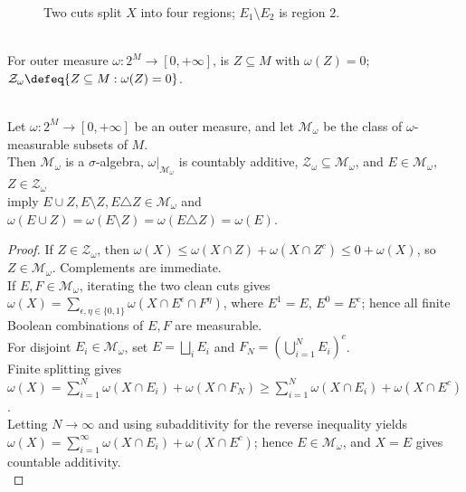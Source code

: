 \begin{figure}[H]
  \centering
  
  \caption{Two cuts split $X$ into four regions; $E_1\setminus E_2$ is region $2$.}
  \label{fig:measurable-difference-four-regions}
\end{figure}

\begin{definition} \label{def:outer-measure-zero-sets} \\
For outer measure $\omega:2^M\to[0,+\infty]$,  is $Z\subseteq M$ with $\omega(Z)=0$; $\mathcal{Z}_\omega\defeq\{Z\subseteq M:\omega(Z)=0\}$.
\end{definition}

\begin{theorem} \label{thm:caratheodory-measurable-sets-sigma-algebra} \\
Let $\omega:2^M\to[0,+\infty]$ be an outer measure, and let $\mathcal{M}_\omega$ be the class of $\omega$-measurable subsets of $M$.\\
Then $\mathcal{M}_\omega$ is a $\sigma$-algebra, $\omega|_{\mathcal{M}_\omega}$ is countably additive, $\mathcal{Z}_\omega\subseteq\mathcal{M}_\omega$, and $E\in\mathcal{M}_\omega$, $Z\in\mathcal{Z}_\omega$\\
imply $E\cup Z,E\setminus Z,E\triangle Z\in\mathcal{M}_\omega$ and $\omega(E\cup Z)=\omega(E\setminus Z)=\omega(E\triangle Z)=\omega(E)$.
\begin{proof}
If $Z\in\mathcal{Z}_\omega$, then $\omega(X)\leq\omega(X\cap Z)+\omega(X\cap Z^c)\leq0+\omega(X)$, so $Z\in\mathcal{M}_\omega$. Complements are immediate.\\
If $E,F\in\mathcal{M}_\omega$, iterating the two clean cuts gives $\omega(X)=\sum_{\epsilon,\eta\in\{0,1\}}\omega(X\cap E^\epsilon\cap F^\eta)$, where $E^1=E$, $E^0=E^c$; hence all finite Boolean combinations of $E,F$ are measurable.\\
For disjoint $E_i\in\mathcal{M}_\omega$, set $E=\bigsqcup_iE_i$ and $F_N=(\bigcup_{i=1}^{N}E_i)^c$.\\
Finite splitting gives $\omega(X)=\sum_{i=1}^{N}\omega(X\cap E_i)+\omega(X\cap F_N)\geq\sum_{i=1}^{N}\omega(X\cap E_i)+\omega(X\cap E^c)$.\\
Letting $N\to\infty$ and using subadditivity for the reverse inequality yields $\omega(X)=\sum_{i=1}^{\infty}\omega(X\cap E_i)+\omega(X\cap E^c)$; hence $E\in\mathcal{M}_\omega$, and $X=E$ gives countable additivity.\\

\end{proof}
\end{theorem}
